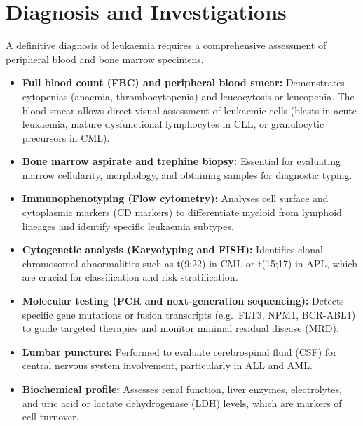 \section*{Diagnosis and Investigations}
A definitive diagnosis of leukaemia requires a comprehensive assessment of peripheral blood and bone marrow specimens.
\begin{itemize}
    \item \textbf{Full blood count (FBC) and peripheral blood smear:} Demonstrates cytopenias (anaemia, thrombocytopenia) and leucocytosis or leucopenia. The blood smear allows direct visual assessment of leukaemic cells (blasts in acute leukaemia, mature dysfunctional lymphocytes in CLL, or granulocytic precursors in CML).
    \item \textbf{Bone marrow aspirate and trephine biopsy:} Essential for evaluating marrow cellularity, morphology, and obtaining samples for diagnostic typing.
    \item \textbf{Immunophenotyping (Flow cytometry):} Analyses cell surface and cytoplasmic markers (CD markers) to differentiate myeloid from lymphoid lineages and identify specific leukaemia subtypes.
    \item \textbf{Cytogenetic analysis (Karyotyping and FISH):} Identifies clonal chromosomal abnormalities such as t(9;22) in CML or t(15;17) in APL, which are crucial for classification and risk stratification.
    \item \textbf{Molecular testing (PCR and next-generation sequencing):} Detects specific gene mutations or fusion transcripts (e.g.\ FLT3, NPM1, BCR-ABL1) to guide targeted therapies and monitor minimal residual disease (MRD).
    \item \textbf{Lumbar puncture:} Performed to evaluate cerebrospinal fluid (CSF) for central nervous system involvement, particularly in ALL and AML.
    \item \textbf{Biochemical profile:} Assesses renal function, liver enzymes, electrolytes, and uric acid or lactate dehydrogenase (LDH) levels, which are markers of cell turnover.
\end{itemize}

